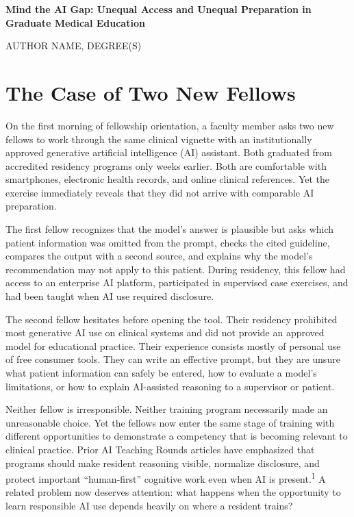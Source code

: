 \documentclass[12pt]{article}
\newcommand{\ArticleTitle}{Mind the AI Gap: Unequal Access and Unequal Preparation in Graduate Medical Education}
\newcommand{\AuthorName}{AUTHOR NAME, DEGREE(S)}
\begin{document}
\begin{center}
{\Large\bfseries \ArticleTitle\par}

\vspace{0.8em}

\AuthorName
\end{center}

\vspace{1em}

\section*{The Case of Two New Fellows}

On the first morning of fellowship orientation, a faculty member asks two new
fellows to work through the same clinical vignette with an institutionally
approved generative artificial intelligence (AI) assistant. Both graduated
from accredited residency programs only weeks earlier. Both are comfortable
with smartphones, electronic health records, and online clinical references.
Yet the exercise immediately reveals that they did not arrive with comparable
AI preparation.

The first fellow recognizes that the model's answer is plausible but asks
which patient information was omitted from the prompt, checks the cited
guideline, compares the output with a second source, and explains why the
model's recommendation may not apply to this patient. During residency, this
fellow had access to an enterprise AI platform, participated in supervised
case exercises, and had been taught when AI use required disclosure.

The second fellow hesitates before opening the tool. Their residency prohibited
most generative AI use on clinical systems and did not provide an approved
model for educational practice. Their experience consists mostly of personal
use of free consumer tools. They can write an effective prompt, but they are
unsure what patient information can safely be entered, how to evaluate a
model's limitations, or how to explain AI-assisted reasoning to a supervisor
or patient.

Neither fellow is irresponsible. Neither training program necessarily made an
unreasonable choice. Yet the fellows now enter the same stage of training with
different opportunities to demonstrate a competency that is becoming relevant
to clinical practice. Prior AI Teaching Rounds articles have emphasized that
programs should make resident reasoning visible, normalize disclosure, and
protect important ``human-first'' cognitive work even when AI is present.\textsuperscript{1}
A related problem now deserves attention: what happens when the opportunity to
learn responsible AI use depends heavily on where a resident trains?
\end{document}
